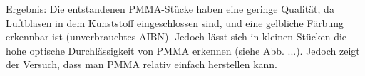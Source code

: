 Ergebnis: Die entstandenen PMMA-Stücke haben eine geringe Qualität, da
Luftblasen in dem Kunststoff eingeschlossen sind, und eine gelbliche Färbung
erkennbar ist (unverbrauchtes AIBN). Jedoch lässt sich in kleinen Stücken die
hohe optische Durchlässigkeit von PMMA erkennen (siehe Abb. ...). Jedoch zeigt
der Versuch, dass man PMMA relativ einfach herstellen kann.

